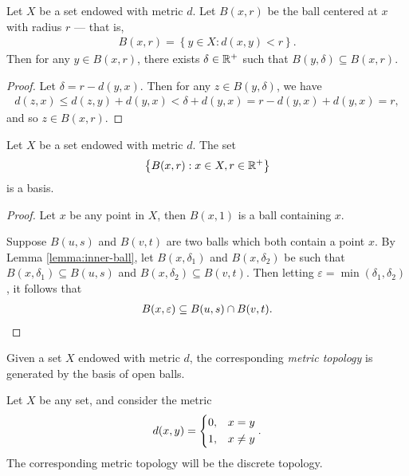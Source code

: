 \begin{lemma}\label{lemma:inner-ball}
    Let $X$ be a set endowed with metric $d$. Let $B(x, r)$ be the ball centered at $x$ with radius $r$ --- that is,
    \begin{align*}
        B(x, r) = \left\{y \in X : d(x, y) < r\right\}.
    \end{align*}
    Then for any $y \in B(x, r)$, there exists $\delta \in \mathbb{R}^+$ such that $B(y, \delta) \subseteq B(x, r)$.
\end{lemma}

\begin{proof}
    Let $\delta = r - d(y, x)$. Then for any $z \in B(y, \delta)$, we have
    \begin{align*}
        d(z, x) \leq d(z, y) + d(y, x) < \delta + d(y, x) = r - d(y, x) + d(y, x) = r,
    \end{align*}
    and so $z \in B(x, r)$.
\end{proof}

\begin{lemma}
    Let $X$ be a set endowed with metric $d$. The set
    \begin{align*}
        \left\{B(x, r) : x \in X, r \in \mathbb{R}^{+}\right\}
    \end{align*}
    is a basis.
\end{lemma}

\begin{proof}
    Let $x$ be any point in $X$, then $B(x, 1)$ is a ball containing $x$.

    Suppose $B(u, s)$ and $B(v, t)$ are two balls which both contain a point $x$. By Lemma \ref{lemma:inner-ball}, let $B(x, \delta_1)$ and $B(x, \delta_2)$ be such that $B(x, \delta_1) \subseteq B(u, s)$ and $B(x, \delta_2) \subseteq B(v, t)$. Then letting $\varepsilon = \min(\delta_1,\delta_2)$, it follows that
    \begin{align*}
        B(x, \varepsilon) \subseteq B(u, s) \cap B(v, t).
    \end{align*}
\end{proof}

\begin{defn}
    Given a set $X$ endowed with metric $d$, the corresponding \emph{metric topology} is generated by the basis of open balls.
\end{defn}

\begin{exmp}
    Let $X$ be any set, and consider the metric
    \begin{align*}
        d(x, y) = \begin{dcases}
            0, &x = y \\
            1, &x \neq y
        \end{dcases}.
    \end{align*}
    The corresponding metric topology will be the discrete topology.
\end{exmp}

